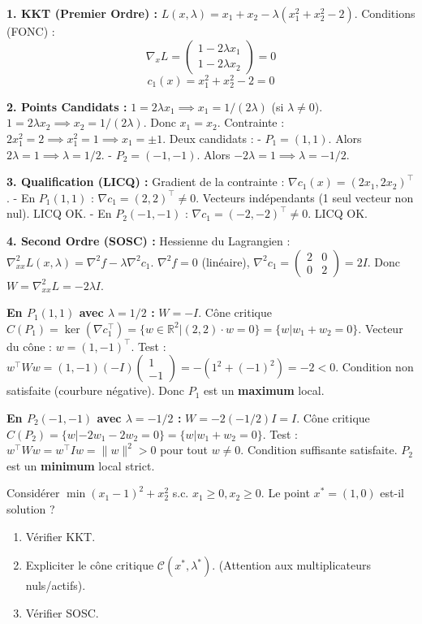 \begin{correction}
\textbf{1. KKT (Premier Ordre) :}
$L(x, \lambda) = x_1 + x_2 - \lambda(x_1^2 + x_2^2 - 2)$.
Conditions (FONC) :
$$ \nabla_x L = \begin{pmatrix} 1 - 2\lambda x_1 \\ 1 - 2\lambda x_2 \end{pmatrix} = 0 $$
$$ c_1(x) = x_1^2 + x_2^2 - 2 = 0 $$

\textbf{2. Points Candidats :}
$1 = 2\lambda x_1 \implies x_1 = 1/(2\lambda)$ (si $\lambda \ne 0$).
$1 = 2\lambda x_2 \implies x_2 = 1/(2\lambda)$.
Donc $x_1 = x_2$.
Contrainte : $2x_1^2 = 2 \implies x_1^2 = 1 \implies x_1 = \pm 1$.
Deux candidats :
- $P_1 = (1, 1)$. Alors $2\lambda = 1 \implies \lambda = 1/2$.
- $P_2 = (-1, -1)$. Alors $-2\lambda = 1 \implies \lambda = -1/2$.

\textbf{3. Qualification (LICQ) :}
Gradient de la contrainte : $\nabla c_1(x) = (2x_1, 2x_2)^\top$.
- En $P_1(1,1)$ : $\nabla c_1 = (2, 2)^\top \ne 0$. Vecteurs indépendants (1 seul vecteur non nul). LICQ OK.
- En $P_2(-1,-1)$ : $\nabla c_1 = (-2, -2)^\top \ne 0$. LICQ OK.

\textbf{4. Second Ordre (SOSC) :}
Hessienne du Lagrangien : $\nabla_{xx}^2 L(x, \lambda) = \nabla^2 f - \lambda \nabla^2 c_1$.
$\nabla^2 f = 0$ (linéaire), $\nabla^2 c_1 = \begin{pmatrix} 2 & 0 \\ 0 & 2 \end{pmatrix} = 2I$.
Donc $W = \nabla_{xx}^2 L = -2\lambda I$.

\textbf{En $P_1(1,1)$ avec $\lambda = 1/2$ :}
$W = -I$.
Cône critique $C(P_1) = \ker(\nabla c_1^\top) = \{ w \in \mathbb{R}^2 | (2, 2) \cdot w = 0 \} = \{ w | w_1 + w_2 = 0 \}$.
Vecteur du cône : $w = (1, -1)^\top$.
Test : $w^\top W w = (1, -1) (-I) \begin{pmatrix} 1 \\ -1 \end{pmatrix} = - (1^2 + (-1)^2) = -2 < 0$.
Condition non satisfaite (courbure négative). Donc $P_1$ est un \textbf{maximum} local.

\textbf{En $P_2(-1,-1)$ avec $\lambda = -1/2$ :}
$W = -2(-1/2)I = I$.
Cône critique $C(P_2) = \{ w | -2w_1 - 2w_2 = 0 \} = \{ w | w_1 + w_2 = 0 \}$.
Test : $w^\top W w = w^\top I w = \|w\|^2 > 0$ pour tout $w \ne 0$.
Condition suffisante satisfaite. $P_2$ est un \textbf{minimum} local strict.
\end{correction}
\bigskip

\bigskip
\begin{exercice}
Considérer $\min (x_1 - 1)^2 + x_2^2$ s.c. $x_1 \ge 0, x_2 \ge 0$.
Le point $x^* = (1, 0)$ est-il solution ?
\begin{enumerate}
    \item Vérifier KKT.
    \item Expliciter le cône critique $\mathcal{C}(x^*, \lambda^*)$. (Attention aux multiplicateurs nuls/actifs).
    \item Vérifier SOSC.
\end{enumerate}
\end{exercice}

